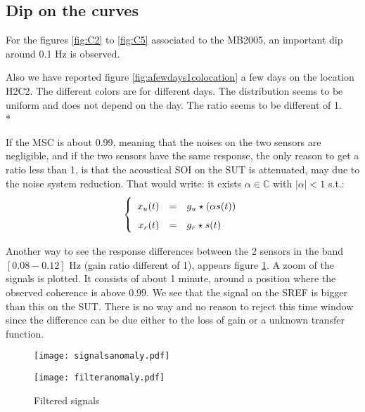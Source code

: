 
\newpage\clearpage
\subsection{Dip on the curves}
For the figures \ref{fig:C2} to \ref{fig:C5} associated to the MB2005, an important dip around 0.1 Hz is observed. 

Also we have reported figure \ref{fig:afewdays1colocation} a few days on the location H2C2. The different colors are for different days. The distribution seems to be uniform and does not depend on the day. The ratio seems to be different of 1.\\*

If the MSC is about 0.99, meaning that the noises on the two sensors are negligible, and if the two sensors have the same response, the only reason to get a ratio less than 1, is that the acoustical SOI on the SUT is attenuated, may due to the noise system reduction. That would write: it exists $\alpha\in\mathbb{C}$ with $|\alpha|<1$ s.t.:
\begin{eqnarray}
\label{eq:model-of-obervation}
\left\{
\renewcommand\arraystretch{1.6}
\begin{array}{rcl}
x_{\ut}(t)&=&g_{\ut}  \star (\alpha s(t))
\\
x_{\rf}(t)&=&g_{\rf}  \star s(t)
\end{array}
\right.
\end{eqnarray}



Another way to see the response differences between the 2 sensors in the band  $[0.08-0.12]$ Hz (gain ratio different of 1), appears figure \ref{fig:filteredsignals}. A zoom of the signals is plotted. It consists of about 1 minute, around a position where the observed coherence is above $0.99$. We see that the signal on the SREF  is bigger than this on the SUT. There is no way and no reason to reject this time window since the difference can be due either to the loss of gain or a unknown transfer function. 
\begin{figure}%
\begin{minipage}{10cm}
              \texttt{[image: signalsanomaly.pdf]}
\end{minipage}
\begin{minipage}[c]{8cm}
              \texttt{[image: filteranomaly.pdf]}    

\end{minipage}
\centering
\caption{Filtered signals}
\label{fig:filteredsignals}
\end{figure}

